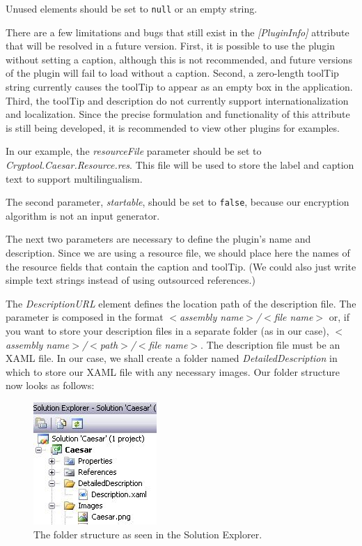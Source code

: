 \noindent Unused elements should be set to \texttt{null} or an empty string.

There are a few limitations and bugs that still exist in the \textit{[PluginInfo]} attribute that will be resolved in a future version. First, it is possible to use the plugin without setting a caption, although this is not recommended, and future versions of the plugin will fail to load without a caption. Second, a zero-length toolTip string currently causes the toolTip to appear as an empty box in the application. Third, the toolTip and description do not currently support internationalization and localization. Since the precise formulation and functionality of this attribute is still being developed, it is recommended to view other plugins for examples.

In our example, the \textit{resourceFile} parameter should be set to \textit{Cryptool.Caesar.Resource.res}. This file will be used to store the label and caption text to support multilingualism.

The second parameter, \textit{startable}, should be set to \texttt{false}, because our encryption algorithm is not an input generator.

The next two parameters are necessary to define the plugin's name and description. Since we are using a resource file, we should place here the names of the resource fields that contain the caption and toolTip. (We could also just write simple text strings instead of using outsourced references.)

The \textit{DescriptionURL} element defines the location path of the description file. The parameter is composed in the format \textit{$<$assembly name$>$/$<$file name$>$} or, if you want to store your description files in a separate folder (as in our case), \textit{$<$assembly name$>$/$<$path$>$/$<$file name$>$}. The description file must be an XAML file. In our case, we shall create a folder named \textit{DetailedDescription} in which to store our XAML file with any necessary images. Our folder structure now looks as follows:

\begin{figure}[h!]
	\centering
		\includegraphics[width=.30\textwidth]{figures/detailed_description.jpg}
	\caption{The folder structure as seen in the Solution Explorer.}
	\label{fig:attribute_plugininfo_icon_path}
\end{figure}


